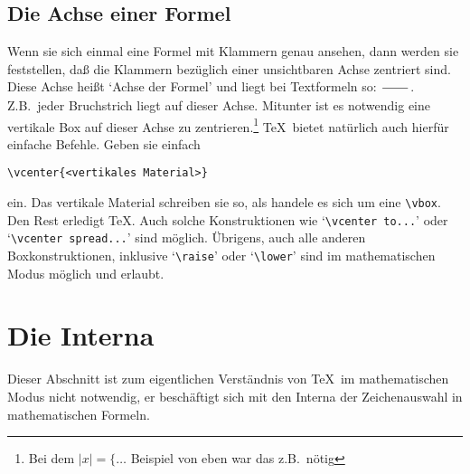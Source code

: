 \subsection{Die Achse einer Formel}
Wenn sie sich einmal eine Formel mit Klammern genau ansehen, dann
werden sie feststellen, da\ss{} die Klammern bez\"uglich einer unsichtbaren
Achse 
zentriert sind. Diese Achse hei\ss{}t `Achse der Formel' und liegt
bei Textformeln so: $\hskip 2em\over$. Z.B.\ jeder 
Bruchstrich liegt
auf dieser Achse. Mitunter ist es notwendig eine vertikale
Box auf
dieser Achse zu 
zentrieren.\footnote{Bei dem $|x|=\{\ldots$ Beispiel
von eben war das z.B.\ n\"otig} \TeX\ bietet nat\"urlich auch hierf\"ur
einfache Befehle. Geben sie einfach
\begin{verbatim}
\vcenter{<vertikales Material>}
\end{verbatim}
ein. Das vertikale Material schreiben sie so, als handele es sich um
eine 
\verb|\vbox|. Den Rest erledigt \TeX. Auch solche Konstruktionen
wie `\verb|\vcenter to...|' oder `\verb|\vcenter spread...|' sind
m\"oglich. \"Ubrigens, auch alle anderen Boxkonstruktionen, inklusive
`\verb|\raise|' oder 
`\verb|\lower|' sind im mathematischen Modus
m\"oglich und erlaubt.
\section{Die Interna}
Dieser Abschnitt ist zum eigentlichen Verst\"andnis von \TeX\ im
mathematischen Modus nicht notwendig, er besch\"aftigt sich mit den
Interna der Zeichenauswahl in mathematischen Formeln.
